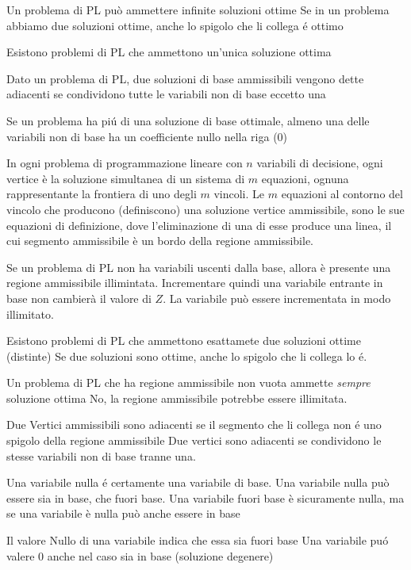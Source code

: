 \documentclass[12pt, a4paper, openany]{book}
\begin{document}
\affermazionetrue
{Un problema di PL può ammettere infinite soluzioni ottime}
{Se in un problema abbiamo due soluzioni ottime, anche lo spigolo che li collega é ottimo }

\affermazionetrue
{Esistono problemi di PL che ammettono un'unica soluzione ottima}

\affermazionetrue
{Dato un problema di PL, due soluzioni di base ammissibili vengono dette adiacenti se condividono tutte le variabili non di base eccetto una}

\affermazionetrue
{Se un problema ha piú di una soluzione di base ottimale, almeno una delle variabili non di base ha un coefficiente nullo nella riga (0)}

\affermazionetrue
{In ogni problema di programmazione lineare con $n$ variabili di decisione, ogni vertice è la soluzione simultanea
di un sistema di $m$ equazioni, ognuna rappresentante la frontiera di uno degli $m$ vincoli. Le $m$ equazioni al 
contorno del vincolo che producono (definiscono) una soluzione vertice ammissibile, sono le sue equazioni di 
definizione, dove l'eliminazione di una di esse produce una linea, il cui segmento ammissibile è un bordo della 
regione ammissibile.}

\affermazionetrue
{Se un problema di PL non ha variabili uscenti dalla base, allora è presente una regione ammissibile illimintata. Incrementare quindi
 una variabile entrante in base non cambierà il valore di $Z$. La variabile può essere incrementata in modo illimitato.}


\affermazionefalse
{Esistono problemi di PL che ammettono esattamete due soluzioni ottime (distinte)}
{Se due soluzioni sono ottime, anche lo spigolo che li collega lo é.}

\affermazionefalse
{Un problema di PL che ha regione ammissibile non vuota ammette \emph{sempre} soluzione ottima}
{No, la regione ammissibile potrebbe essere illimitata.}


\affermazionefalse
{Due Vertici ammissibili sono adiacenti se il segmento che li collega non é uno spigolo della regione ammissibile}
{Due vertici sono adiacenti se condividono le stesse variabili non di base tranne una.}

\affermazionefalse
{Una variabile nulla é certamente una variabile di base.}
{Una variabile nulla può essere sia in base, che fuori base. Una variabile fuori base è sicuramente nulla,
ma se una variabile è nulla può anche essere in base}

\affermazionefalse
{Il valore Nullo di una variabile indica che essa sia fuori base}
{Una variabile puó valere 0 anche nel caso sia in base (soluzione degenere)}
\end{document}
